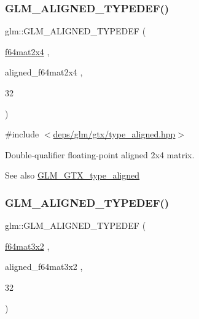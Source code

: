 \subsubsection{\texorpdfstring{G\+L\+M\+\_\+\+A\+L\+I\+G\+N\+E\+D\+\_\+\+T\+Y\+P\+E\+D\+E\+F()}{GLM\_ALIGNED\_TYPEDEF()}\hspace{0.1cm}{\footnotesize\ttfamily [198/209]}}
{\footnotesize\ttfamily glm\+::\+G\+L\+M\+\_\+\+A\+L\+I\+G\+N\+E\+D\+\_\+\+T\+Y\+P\+E\+D\+EF (\begin{DoxyParamCaption}\item[{\hyperlink{group__gtc__type__precision_gae075a2083e1801ada5c99c91f79eb6ed}{f64mat2x4}}]{,  }\item[{aligned\+\_\+f64mat2x4}]{,  }\item[{32}]{ }\end{DoxyParamCaption})}



{\ttfamily \#include $<$\hyperlink{gtx_2type__aligned_8hpp}{deps/glm/gtx/type\+\_\+aligned.\+hpp}$>$}

Double-\/qualifier floating-\/point aligned 2x4 matrix. \begin{DoxySeeAlso}{See also}
\hyperlink{group__gtx__type__aligned}{G\+L\+M\+\_\+\+G\+T\+X\+\_\+type\+\_\+aligned} 
\end{DoxySeeAlso}
\mbox{\label{group__gtx__type__aligned_ga9ddf5212777734d2fd841a84439f3bdf}} 
\subsubsection{\texorpdfstring{G\+L\+M\+\_\+\+A\+L\+I\+G\+N\+E\+D\+\_\+\+T\+Y\+P\+E\+D\+E\+F()}{GLM\_ALIGNED\_TYPEDEF()}\hspace{0.1cm}{\footnotesize\ttfamily [199/209]}}
{\footnotesize\ttfamily glm\+::\+G\+L\+M\+\_\+\+A\+L\+I\+G\+N\+E\+D\+\_\+\+T\+Y\+P\+E\+D\+EF (\begin{DoxyParamCaption}\item[{\hyperlink{group__gtc__type__precision_ga311a3bf48bfe2c95150e9f71db9063c5}{f64mat3x2}}]{,  }\item[{aligned\+\_\+f64mat3x2}]{,  }\item[{32}]{ }\end{DoxyParamCaption})}



